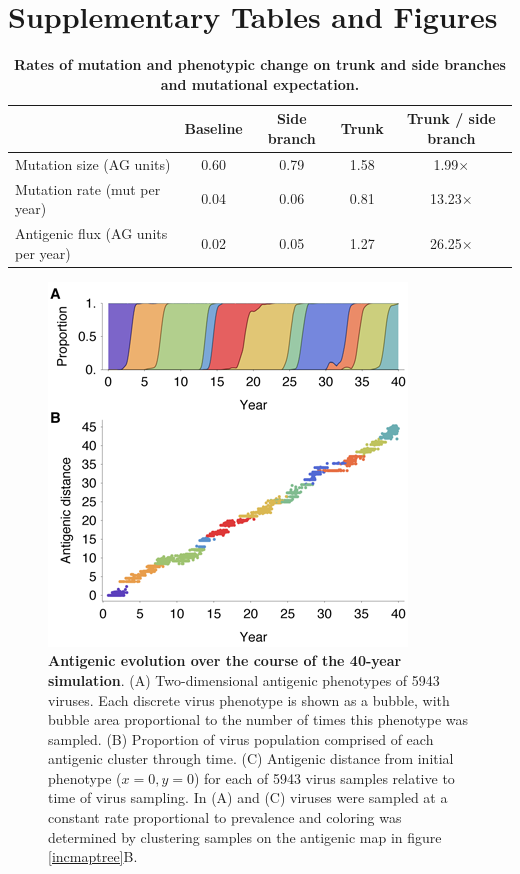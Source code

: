 


\vspace{1cm}

\section*{Supplementary Tables and Figures}

\begin{table}[h]
	\centering
	\caption{\textbf{Rates of mutation and phenotypic change on trunk and side branches and mutational expectation.}}
	\label{mktable}
	\begin{tabular}{ l c c c c } 
	\hline
		 								& Baseline 	& Side branch 	& Trunk		& Trunk / side branch \\
	\hline				
	Mutation size (AG units)			& 0.60		& 0.79			& 1.58		& 1.99$\times$ \\
	Mutation rate (mut per year)		& 0.04		& 0.06			& 0.81		& 13.23$\times$ \\	
	Antigenic flux (AG units per year)	& 0.02		& 0.05			& 1.27		& 26.25$\times$ \\		
	\hline
	\end{tabular}
\end{table}

\pagebreak

\begin{figure}[H]
	\centering
	\includegraphics{figures/phenotypes}
	\caption{\textbf{Antigenic evolution over the course of the 40-year simulation}. (A) Two-dimensional antigenic phenotypes of 5943 viruses.  Each discrete virus phenotype is shown as a bubble, with bubble area proportional to the number of times this phenotype was sampled. (B) Proportion of virus population comprised of each antigenic cluster through time.  (C) Antigenic distance from initial phenotype ($x=0,y=0$) for each of 5943 virus samples relative to time of virus sampling. In (A) and (C) viruses were sampled at a constant rate proportional to prevalence and coloring was determined by clustering samples on the antigenic map in figure \ref{incmaptree}B.}
	\label{phenotypes}
\end{figure}

